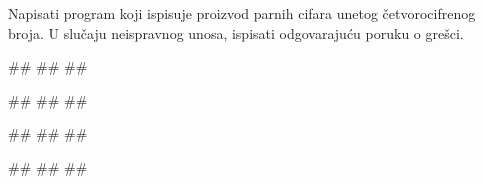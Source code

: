 \begin{Exercise}[label=KT_NG_14] 
Napisati program koji ispisuje proizvod parnih cifara unetog četvorocifrenog broja. 
U slučaju neispravnog unosa, ispisati odgovarajuću poruku o grešci.

\begin{miditest}
\begin{upotreba}{1}
#\naslovInt#
##
##
\end{upotreba}
\end{miditest}
\begin{miditest}
\begin{upotreba}{2}
#\naslovInt#
##
##
\end{upotreba}
\end{miditest}

\begin{miditest}
\begin{upotreba}{3}
#\naslovInt#
##
##
\end{upotreba}
\end{miditest}
\begin{miditest}
\begin{upotreba}{4}
#\naslovInt#
##
##
\end{upotreba}
\end{miditest}

\end{Exercise}
\ifresenja
 \begin{Answer}[ref=KT_NG_14]
\end{Answer}
\fi



